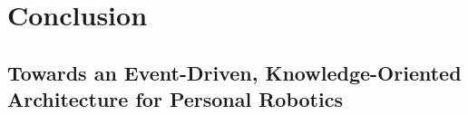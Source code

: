 \documentclass{svmult}
\begin{document}





\section{Conclusion}
\label{conclusion}

\subsection{Towards an Event-Driven, Knowledge-Oriented Architecture for Personal Robotics}
\end{document}
